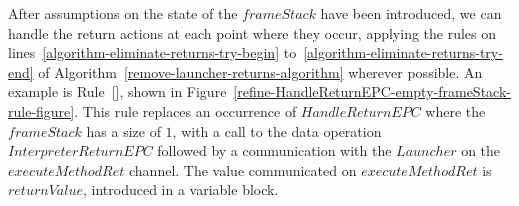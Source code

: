 
After assumptions on the state of the $frameStack$ have been
introduced, we can handle the return actions at each point where they
occur, applying the rules on
lines~\ref{algorithm-eliminate-returns-try-begin}
to~\ref{algorithm-eliminate-returns-try-end} of
Algorithm~\ref{remove-launcher-returns-algorithm} wherever possible.
An example is
Rule~[], shown
in Figure~\ref{refine-HandleReturnEPC-empty-frameStack-rule-figure}.
This rule replaces an occurrence of $HandleReturnEPC$ where the
$frameStack$ has a size of $1$, with a call to the data operation
$InterpreterReturnEPC$ followed by a communication with the $Launcher$
on the $executeMethodRet$ channel.
The value communicated on $executeMethodRet$ is $returnValue$,
introduced in a variable block.

